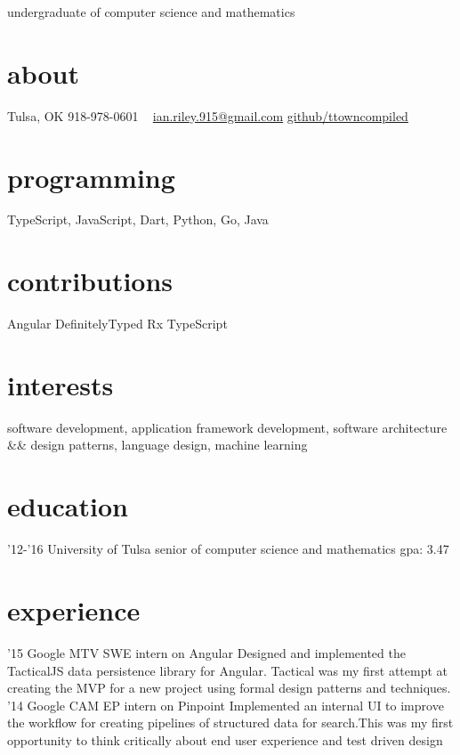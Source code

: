 \documentclass[]{friggeri-cv}
\begin{document}
       {undergraduate of computer science and mathematics}


\begin{aside}
  \section{about}
    Tulsa, OK
    918-978-0601
    ~
    \href{mailto:ian.riley.915@gmail.com}{ian.riley.915@gmail.com}
    \href{https://github.com/ttowncompiled}{github/ttowncompiled}
  \section{programming}
    TypeScript, JavaScript, Dart, Python, Go, Java
  \section{contributions}
    Angular
    DefinitelyTyped
    Rx
    TypeScript
\end{aside}

\section{interests}
software development, application framework development, software architecture \&\& design patterns, language design, machine learning

\section{education}

\begin{entrylist}
  \entry
    {'12-'16}
    {University of Tulsa}
    {senior of computer science and mathematics}
    {gpa: 3.47}
\end{entrylist}

\section{experience}

\begin{entrylist}
  \entry
    {'15}
    {Google MTV}
    {SWE intern on Angular}
    {Designed and implemented the TacticalJS data persistence library for Angular. Tactical was my first attempt at creating the MVP for a new project using formal design patterns and techniques.}
  \entry
    {'14}
    {Google CAM}
    {EP intern on Pinpoint}
    {Implemented an internal UI to improve the workflow for creating pipelines of structured data for search.This was my first opportunity to think critically about end user experience and test driven design}
\end{entrylist}
\end{document}
